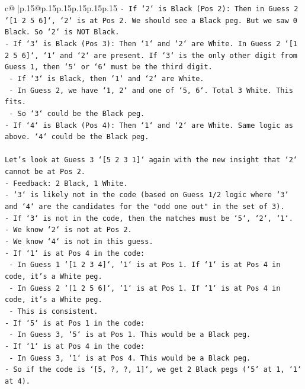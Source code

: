 \documentclass{article}
\begin{document}
{\begin{supertabular}{c@{$\;$}|p{.15\linewidth}@{}p{.15\linewidth}p{.15\linewidth}p{.15\linewidth}p{.15\linewidth}p{.15\linewidth}}
{{{\texttt{{-} If `2` is Black (Pos 2): Then in Guess 2 `{[}1 2 5 6{]}`, `2` is at Pos 2. We should see a Black peg. But we saw 0 Black. So `2` is NOT Black.} \\
\texttt{{-} If `3` is Black (Pos 3): Then `1` and `2` are White. In Guess 2 `{[}1 2 5 6{]}`, `1` and `2` are present. If `3` is the only other digit from Guess 1, then `5` or `6` must be the third digit.} \\
\texttt{    {-} If `3` is Black, then `1` and `2` are White.} \\
\texttt{    {-} In Guess 2, we have `1, 2` and one of `5, 6`. Total 3 White. This fits.} \\
\texttt{    {-} So `3` could be the Black peg.} \\
\texttt{{-} If `4` is Black (Pos 4): Then `1` and `2` are White. Same logic as above. `4` could be the Black peg.} \\
\\ 
\texttt{Let's look at Guess 3 `{[}5 2 3 1{]}` again with the new insight that `2` cannot be at Pos 2.} \\
\texttt{{-} Feedback: 2 Black, 1 White.} \\
\texttt{{-} `3` is likely not in the code (based on Guess 1/2 logic where `3` and `4` are the candidates for the "odd one out" in the set of 3).} \\
\texttt{{-} If `3` is not in the code, then the matches must be `5`, `2`, `1`.} \\
\texttt{{-} We know `2` is not at Pos 2.} \\
\texttt{{-} We know `4` is not in this guess.} \\
\texttt{{-} If `1` is at Pos 4 in the code:} \\
\texttt{    {-} In Guess 1 `{[}1 2 3 4{]}`, `1` is at Pos 1. If `1` is at Pos 4 in code, it's a White peg.} \\
\texttt{    {-} In Guess 2 `{[}1 2 5 6{]}`, `1` is at Pos 1. If `1` is at Pos 4 in code, it's a White peg.} \\
\texttt{    {-} This is consistent.} \\
\texttt{{-} If `5` is at Pos 1 in the code:} \\
\texttt{    {-} In Guess 3, `5` is at Pos 1. This would be a Black peg.} \\
\texttt{{-} If `1` is at Pos 4 in the code:} \\
\texttt{    {-} In Guess 3, `1` is at Pos 4. This would be a Black peg.} \\
\texttt{{-} So if the code is `{[}5, ?, ?, 1{]}`, we get 2 Black pegs (`5` at 1, `1` at 4).} \\
}}}
\end{supertabular}}
\end{document}
